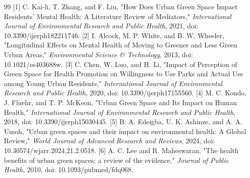 \documentclass[conference]{IEEEtran}
\begin{document}
\begin{thebibliography}{99}
 [1] C. Kai-li, T. Zhang, and F. Liu, "How Does Urban Green Space Impact Residents’ Mental Health: A Literature Review of Mediators," \textit{International Journal of Environmental Research and Public Health}, 2021, doi: 10.3390/ijerph182211746.
 [2] I. Alcock, M. P. White, and B. W. Wheeler, "Longitudinal Effects on Mental Health of Moving to Greener and Less Green Urban Areas," \textit{Environmental Science \& Technology}, 2013, doi: 10.1021/es403688w.
 [3] C. Chen, W. Luo, and H. Li, "Impact of Perception of Green Space for Health Promotion on Willingness to Use Parks and Actual Use among Young Urban Residents," \textit{International Journal of Environmental Research and Public Health}, 2020, doi: 10.3390/ijerph17155560.
 [4] M. C. Kondo, J. Fluehr, and T. P. McKeon, "Urban Green Space and Its Impact on Human Health," \textit{International Journal of Environmental Research and Public Health}, 2018, doi: 10.3390/ijerph15030445.
 [5] B. A. Edeigba, U. K. Ashinze, and A. A. Umoh, "Urban green spaces and their impact on environmental health: A Global Review," \textit{World Journal of Advanced Research and Reviews}, 2024, doi: 10.30574/wjarr.2024.21.2.0518.
 [6] A. C. Lee and R. Maheswaran, "The health benefits of urban green spaces: a review of the evidence," \textit{Journal of Public Health}, 2010, doi: 10.1093/pubmed/fdq068.
\end{thebibliography}
\end{document}
